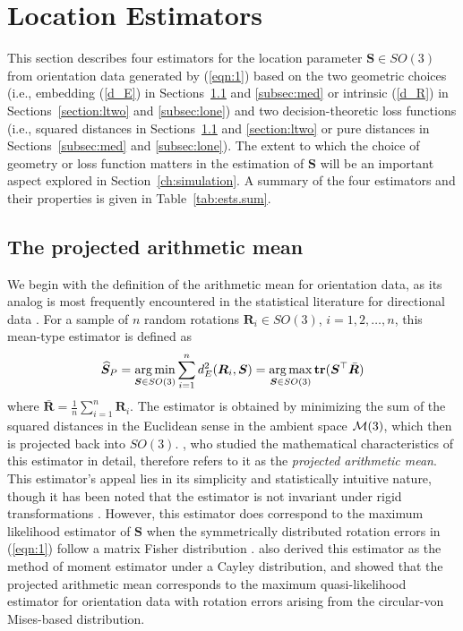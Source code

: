 \section{Location Estimators}\label{sec:estimators}
This section describes four estimators for   the location parameter $\bm{S}\in SO(3)$ from orientation data generated by (\ref{eqn:1})
based on the two geometric choices (i.e., embedding (\ref{d_E})  in Sections~\ref{subsec:pam} and \ref{subsec:med} or intrinsic (\ref{d_R}) in Sections~\ref{section:ltwo}
and \ref{subsec:lone})
and two decision-theoretic loss functions (i.e., squared distances in Sections~\ref{subsec:pam} and \ref{section:ltwo} or pure distances in Sections~\ref{subsec:med} and \ref{subsec:lone}).    The extent to which the choice of geometry or loss function matters in the estimation of $\bm{S}$ will be an important
aspect explored in Section~\ref{ch:simulation}.  A summary of the four estimators and their properties is given in Table~\ref{tab:ests.sum}.



\subsection{The projected arithmetic mean}
\label{subsec:pam}

We begin with the definition of the arithmetic mean for orientation data, as its analog is most frequently encountered in the statistical literature for directional data \citep[e.g. see][]{mardia00}.   For a sample of $n$ random rotations $\bm{R}_i\in SO(3)$, $i=1,2,\dots,n$, this mean-type estimator is defined as
\begin{equation}\label{est:pam}
\widehat{\bm{S}}_P=\operatorname*{arg\,min}_{\bm{S}\in
SO(3)}\sum_{i=1}^nd_E^2(\bm{R}_i,\bm{S})=\operatorname*{arg\,max}_{\bm{S}\in
SO(3)}{\mathbf{tr}}(\bm{S}^{\top}\bar{\bm{R}})
\end{equation}
where $\bar{\bm{R}}=\frac{1}{n}\sum_{i=1}^n\bm{R}_i$. The estimator is obtained by minimizing the sum of the squared distances in the Euclidean
sense in the ambient space $\mathcal{M}(3)$, which then is projected back into $SO(3)$. \citet{moakher02}, who studied the mathematical characteristics of this estimator in detail, therefore refers to it as the \textit{projected arithmetic mean}.    This estimator's appeal lies in its simplicity and statistically intuitive nature, though it has been noted that the estimator is not invariant under rigid transformations \citep[see][]{moakher02}.  
However, this estimator does correspond to the maximum likelihood estimator of $\bm{S}$ when the symmetrically distributed rotation errors
in (\ref{eqn:1}) follow a matrix Fisher distribution \citep{jupp79}.  \citet{leon06} also derived this estimator as the method of moment estimator under a Cayley  distribution, and 
 \citet{bingham09} showed that the projected arithmetic mean corresponds to the maximum quasi-likelihood estimator for orientation data with rotation errors arising from the circular-von Mises-based distribution.  

